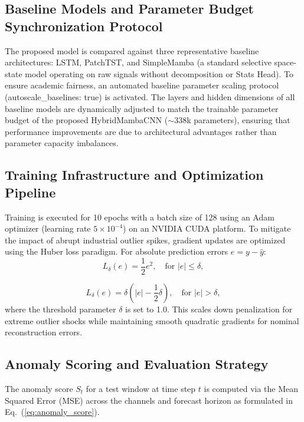 \documentclass[cmes,article,submit,moreauthors,pdftex]{Definitions/tsp}
\begin{document}
\subsection{Baseline Models and Parameter Budget Synchronization Protocol} \label{sect:s4dot2}
The proposed model is compared against three representative baseline architectures: LSTM, PatchTST, and SimpleMamba (a standard selective space-state model operating on raw signals without decomposition or Stats Head). To ensure academic fairness, an automated baseline parameter scaling protocol (autoscale\_baselines: true) is activated. The layers and hidden dimensions of all baseline models are dynamically adjusted to match the trainable parameter budget of the proposed HybridMambaCNN ($\sim$338k parameters), ensuring that performance improvements are due to architectural advantages rather than parameter capacity imbalances.


\subsection{Training Infrastructure and Optimization Pipeline} \label{sect:s4dot3}
Training is executed for 10 epochs with a batch size of 128 using an Adam optimizer (learning rate $5 \times 10^{-4}$) on an NVIDIA CUDA platform. To mitigate the impact of abrupt industrial outlier spikes, gradient updates are optimized using the Huber loss paradigm. For absolute prediction errors $e = y - \hat{y}$:
\begin{equation}
L_{\delta} (e) = \frac{1}{2} e^{2}, \quad \text{for } |e| \leq \delta,
\tag{25}
\end{equation}

\begin{equation}
L_{\delta} (e) = \delta \left(|e| - \frac{1}{2} \delta\right), \quad \text{for } |e| > \delta,
\tag{26}
\end{equation}
where the threshold parameter $\delta$ is set to 1.0. This scales down penalization for extreme outlier shocks while maintaining smooth quadratic gradients for nominal reconstruction errors.

\subsection{Anomaly Scoring and Evaluation Strategy} \label{sect:s4dot4}
The anomaly score $S_t$ for a test window at time step $t$ is computed via the Mean Squared Error (MSE) across the channels and forecast horizon as formulated in Eq.~(\ref{eq:anomaly_score}).
\end{document}
